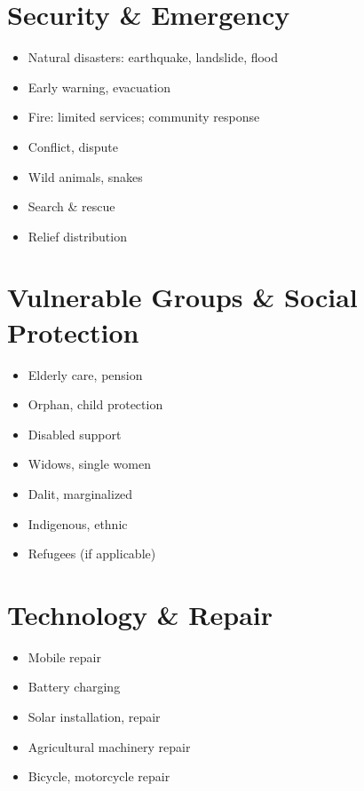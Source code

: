 \documentclass[11pt,a4paper]{article}
\begin{document}
\section{Security \& Emergency}

\begin{itemize}
    \item Natural disasters: earthquake, landslide, flood
    \item Early warning, evacuation
    \item Fire: limited services; community response
    \item Conflict, dispute
    \item Wild animals, snakes
    \item Search \& rescue
    \item Relief distribution
\end{itemize}

\section{Vulnerable Groups \& Social Protection}

\begin{itemize}
    \item Elderly care, pension
    \item Orphan, child protection
    \item Disabled support
    \item Widows, single women
    \item Dalit, marginalized
    \item Indigenous, ethnic
    \item Refugees (if applicable)
\end{itemize}

\section{Technology \& Repair}

\begin{itemize}
    \item Mobile repair
    \item Battery charging
    \item Solar installation, repair
    \item Agricultural machinery repair
    \item Bicycle, motorcycle repair
\end{itemize}
\end{document}
